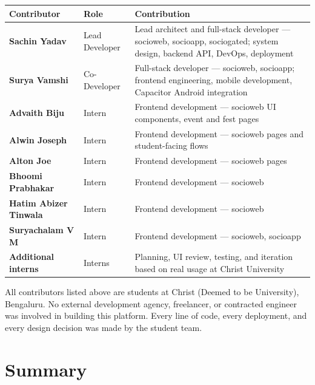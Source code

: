 \documentclass[12pt,a4paper]{article}
\begin{document}
\begin{tabularx}{\textwidth}{L{5cm} L{2.5cm} X}
\toprule
{}
\textbf{Contributor} & \textbf{Role} & \textbf{Contribution} \\
\midrule
\textbf{Sachin Yadav} & Lead Developer & Lead architect and full-stack developer — socioweb, socioapp, sociogated; system design, backend API, DevOps, deployment \\
\addlinespace
\textbf{Surya Vamshi} & Co-Developer & Full-stack developer — socioweb, socioapp; frontend engineering, mobile development, Capacitor Android integration \\
\addlinespace
\textbf{Advaith Biju} & Intern & Frontend development — socioweb UI components, event and fest pages \\
\addlinespace
\textbf{Alwin Joseph} & Intern & Frontend development — socioweb pages and student-facing flows \\
\addlinespace
\textbf{Alton Joe} & Intern & Frontend development — socioweb pages \\
\addlinespace
\textbf{Bhoomi Prabhakar} & Intern & Frontend development — socioweb \\
\addlinespace
\textbf{Hatim Abizer Tinwala} & Intern & Frontend development — socioweb \\
\addlinespace
\textbf{Suryachalam V M} & Intern & Frontend development — socioweb, socioapp \\
\addlinespace
\textbf{Additional interns} & Interns & Planning, UI review, testing, and iteration based on real usage at Christ University \\
\bottomrule
\end{tabularx}

\vspace{0.4cm}
\begin{infobox}
All contributors listed above are students at Christ (Deemed to be University), Bengaluru. No external development agency, freelancer, or contracted engineer was involved in building this platform. Every line of code, every deployment, and every design decision was made by the student team.
\end{infobox}

\newpage
\section{Summary}
\end{document}
